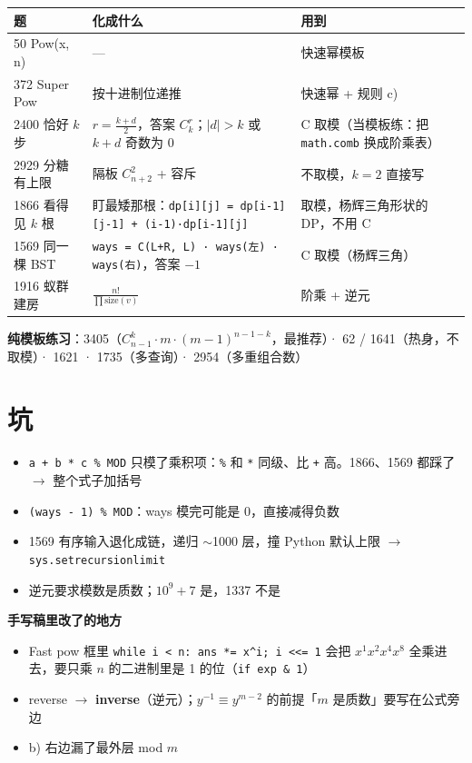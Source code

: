 \documentclass[10pt]{article}
\newcommand{\code}[1]{\texttt{\textcolor{codefg}{#1}}}
\begin{document}
\begin{tabularx}{\linewidth}{@{}l X X@{}}
\toprule
\textbf{题} & \textbf{化成什么} & \textbf{用到}\\
\midrule
50 Pow(x, n) & — & 快速幂模板\\
372 Super Pow & 按十进制位递推 & 快速幂 + 规则 c)\\
2400 恰好 $k$ 步 & $r = \frac{k+d}{2}$，答案 $C_k^r$；$|d| > k$ 或 $k+d$ 奇数为 0 & C 取模（当模板练：把 \code{math.comb} 换成阶乘表）\\
2929 分糖有上限 & 隔板 $C_{n+2}^2$ + 容斥 & 不取模，$k=2$ 直接写\\
1866 看得见 $k$ 根 & 盯最矮那根：\code{dp[i][j] = dp[i-1][j-1] + (i-1)·dp[i-1][j]} & 取模，杨辉三角形状的 DP，不用 C\\
1569 同一棵 BST & \code{ways = C(L+R, L) · ways(左) · ways(右)}，答案 $-1$ & C 取模（杨辉三角）\\
1916 蚁群建房 & $\frac{n!}{\prod \mathrm{size}(v)}$ & 阶乘 + 逆元\\
\bottomrule
\end{tabularx}

\textbf{纯模板练习}：3405（$C_{n-1}^k \cdot m \cdot (m-1)^{n-1-k}$，最推荐）· 62 / 1641（热身，不取模）· 1621 · 1735（多查询）· 2954（多重组合数）

\section{坑}
\begin{itemize}
\item \code{a + b * c \% MOD} 只模了乘积项：\code{\%} 和 \code{*} 同级、比 \code{+} 高。1866、1569 都踩了 $\to$ 整个式子加括号
\item \code{(ways - 1) \% MOD}：ways 模完可能是 0，直接减得负数
\item 1569 有序输入退化成链，递归 $\sim$1000 层，撞 Python 默认上限 $\to$ \code{sys.setrecursionlimit}
\item 逆元要求模数是质数；$10^9+7$ 是，1337 不是
\end{itemize}

\vspace{4pt}
{\small\color{note}
\textbf{手写稿里改了的地方}
\begin{itemize}
\item Fast pow 框里 \code{while i < n: ans *= x\^{}i; i <<= 1} 会把 $x^1 x^2 x^4 x^8$ 全乘进去，要只乘 $n$ 的二进制里是 1 的位（\code{if exp \& 1}）
\item reverse $\to$ \textbf{inverse}（逆元）；$y^{-1} \equiv y^{m-2}$ 的前提「$m$ 是质数」要写在公式旁边
\item b) 右边漏了最外层 mod $m$
\end{itemize}}
\end{document}
